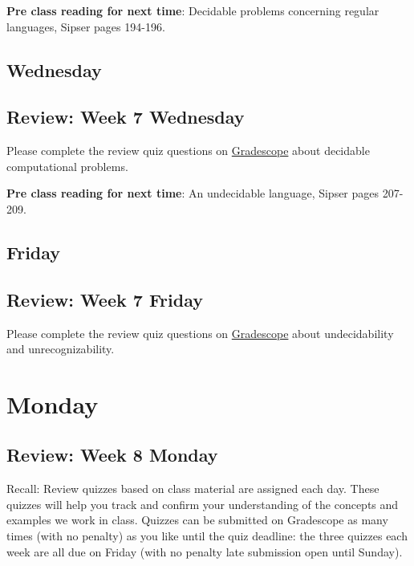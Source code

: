 {\bf Pre class reading for next time}: Decidable problems concerning regular languages, Sipser pages 194-196.


\newpage
\subsection*{Wednesday}



\subsection*{Review: Week 7 Wednesday}

Please complete the review quiz questions on \href{http://gradescope.com}{Gradescope} about 
decidable computational problems.

{\bf Pre class reading for next time}: An undecidable language, Sipser pages 207-209.



\newpage
\subsection*{Friday}



\newpage
\subsection*{Review: Week 7 Friday}


Please complete the review quiz questions on \href{http://gradescope.com}{Gradescope} about 
undecidability and unrecognizability.

\newpage

\section*{Monday}


    
\newpage
\subsection*{Review: Week 8 Monday}


Recall: Review quizzes based on class material are assigned each day. 
These quizzes will help you track and confirm your understanding of the concepts and examples 
we work in class. Quizzes can be submitted on Gradescope as many times (with no penalty) as 
you like until the quiz deadline: the three quizzes each week are all due on Friday (with no penalty 
late submission open until Sunday).


